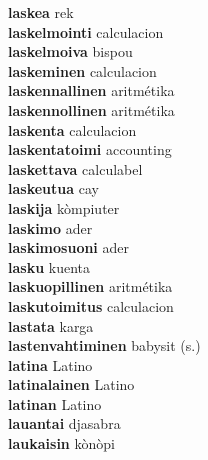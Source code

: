 \textbf{laskea } rek \\
\textbf{laskelmointi } calculacion \\
\textbf{laskelmoiva } bispou \\
\textbf{laskeminen } calculacion \\
\textbf{laskennallinen } aritmétika \\
\textbf{laskennollinen } aritmétika \\
\textbf{laskenta } calculacion \\
\textbf{laskentatoimi } accounting \\
\textbf{laskettava } calculabel \\
\textbf{laskeutua } cay \\
\textbf{laskija } kòmpiuter \\
\textbf{laskimo } ader \\
\textbf{laskimosuoni } ader \\
\textbf{lasku } kuenta \\
\textbf{laskuopillinen } aritmétika \\
\textbf{laskutoimitus } calculacion \\
\textbf{lastata } karga \\
\textbf{lastenvahtiminen } babysit (s.) \\
\textbf{latina } Latino \\
\textbf{latinalainen } Latino \\
\textbf{latinan } Latino \\
\textbf{lauantai } djasabra \\
\textbf{laukaisin } kònòpi \\
